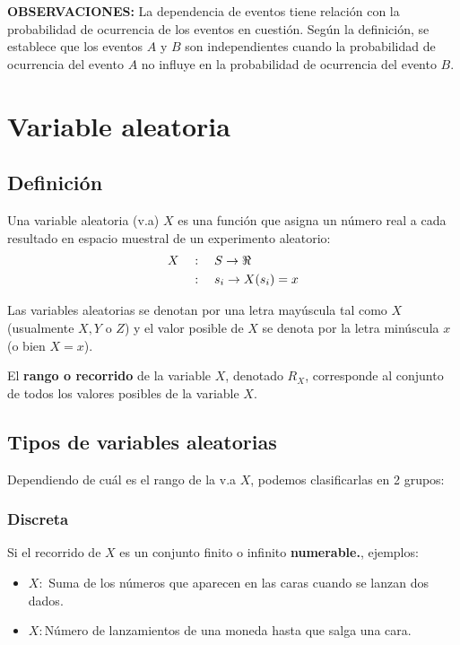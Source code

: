 \documentclass[12pt,twocolumn,a4paper]{report}
\begin{document}
\textbf{OBSERVACIONES:}
La dependencia de eventos tiene relación con la probabilidad de ocurrencia de los eventos en cuestión. Según la definición, se establece que los eventos $A$ y $B$ son independientes cuando la probabilidad de ocurrencia del evento $A$ no influye en la probabilidad de ocurrencia del evento $B$. 

\chapter*{Variable aleatoria}

\section*{Definición}
Una variable aleatoria (v.a) $X$ es una función que asigna un número real a cada resultado en espacio muestral de un experimento aleatorio:
\begin{align*}
X \hspace{10 px} &: \hspace{10 px} S \rightarrow \Re \\
				 &: \hspace{10 px} s_i \rightarrow X(s_i) = x 
\end{align*}

Las variables aleatorias se denotan por una letra mayúscula tal como $X$ (usualmente $X,Y$ o $Z$) y el valor posible de $X$ se denota por la letra minúscula $x$ (o bien $X = x$).

El \textbf{rango o recorrido} de la variable $X$, denotado $R_X$, corresponde al conjunto de todos los valores posibles de la variable $X$.

\section*{Tipos de variables aleatorias}
Dependiendo de cuál es el rango de la v.a $X$, podemos clasificarlas en 2 grupos: 
\subsection*{Discreta}
Si el recorrido de $X$ es un conjunto finito o infinito \textbf{numerable.}, ejemplos:
\begin{itemize}
\setlength\itemsep{0.001cm}
\item{$X:$ Suma de los números que aparecen en las caras cuando se lanzan dos dados.}
\item{$X: $Número de lanzamientos de una moneda hasta que salga una cara.}
\end{itemize}
\end{document}
